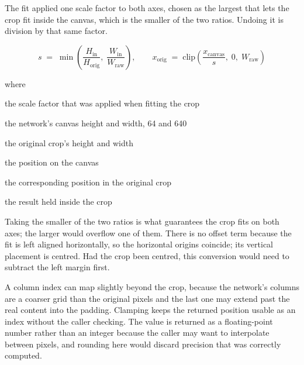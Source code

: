 The fit applied one scale factor to both axes, chosen as the largest that lets the crop fit inside the canvas, which is the smaller of the two ratios. Undoing it is division by that same factor.


\begin{equation}
s \;=\; \min\!\left( \frac{H_{\mathrm{in}}}{H_{\mathrm{orig}}},\; \frac{W_{\mathrm{in}}}{W_{\mathrm{raw}}} \right), \qquad x_{\mathrm{orig}} \;=\; \mathrm{clip}\!\left( \frac{x_{\mathrm{canvas}}}{s},\; 0,\; W_{\mathrm{raw}} \right)
\end{equation}

\noindent where
\begin{description}[leftmargin=2.4em,style=nextline,font=\normalfont\ttfamily]\setlength\itemsep{1pt}
  \item[{$s$}] \normalfont the scale factor that was applied when fitting the crop
  \item[{$H_{\mathrm{in}},\, W_{\mathrm{in}}$}] \normalfont the network's canvas height and width, 64 and 640
  \item[{$H_{\mathrm{orig}},\, W_{\mathrm{raw}}$}] \normalfont the original crop's height and width
  \item[{$x_{\mathrm{canvas}}$}] \normalfont the position on the canvas
  \item[{$x_{\mathrm{orig}}$}] \normalfont the corresponding position in the original crop
  \item[{$\mathrm{clip}(\cdot,0,W_{\mathrm{raw}})$}] \normalfont the result held inside the crop
\end{description}

Taking the smaller of the two ratios is what guarantees the crop fits on both axes; the larger would overflow one of them. There is no offset term because the fit is left aligned horizontally, so the horizontal origins coincide; its vertical placement is centred. Had the crop been centred, this conversion would need to subtract the left margin first.


A column index can map slightly beyond the crop, because the network's columns are a coarser grid than the original pixels and the last one may extend past the real content into the padding. Clamping keeps the returned position usable as an index without the caller checking. The value is returned as a floating-point number rather than an integer because the caller may want to interpolate between pixels, and rounding here would discard precision that was correctly computed.



